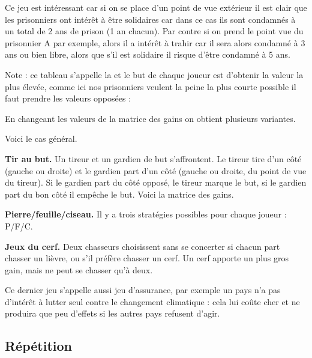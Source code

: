 \documentclass[11pt,class=report,crop=false]{standalone}
\begin{document}
Ce jeu est intéressant car si on se place d'un point de vue extérieur il est clair que les prisonniers ont intérêt à être solidaires car dans ce cas ils sont condamnés à un total de 2 ans de prison (1 an chacun). Par contre si on prend le point vue du prisonnier A par exemple, alors il a intérêt à trahir car il sera alors condamné à 3 ans ou bien libre, alors que s'il est solidaire il risque d'être condamné à 5 ans.

Note : ce tableau s'appelle la  et le but de chaque joueur est d'obtenir la valeur la plus élevée, comme ici nos prisonniers veulent la peine la plus courte possible il faut prendre les valeurs opposées :


En changeant les valeurs de la matrice des gains on obtient plusieurs variantes.

Voici le cas général.



\textbf{Tir au but.} 
Un tireur et un gardien de but s'affrontent. Le tireur tire d'un côté (gauche ou droite) et le gardien part d'un côté (gauche ou droite, du point de vue du tireur). Si le gardien part du côté opposé, le tireur marque le but, si le gardien part du bon côté il empêche le but.
Voici la matrice des gains.




\textbf{Pierre/feuille/ciseau.}
Il y a trois stratégies possibles pour chaque joueur : P/F/C.





\textbf{Jeux du cerf.} 
Deux chasseurs choisissent sans se concerter si chacun part chasser un lièvre, ou s'il préfère chasser un cerf. Un cerf apporte un plus gros gain, mais ne peut se chasser qu'à deux.




Ce dernier jeu s'appelle aussi jeu d'assurance, par exemple un pays n'a pas d'intérêt à lutter seul contre le changement climatique : cela lui coûte cher et ne produira que peu d'effets si les autres pays refusent d'agir.


\subsection{Répétition}
\end{document}

